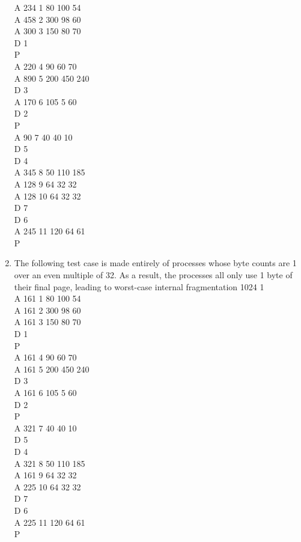 \documentclass{article}
\begin{document}
\begin{enumerate}
	A 234 1 80 100 54\\
	A 458 2 300 98 60\\
	A 300 3 150 80 70\\
	D 1\\
	P\\
	A 220 4 90 60 70\\
	A 890 5 200 450 240\\
	D 3\\
	A 170 6 105 5 60\\
	D 2\\
	P\\
	A 90 7 40 40 10\\
	D 5\\
	D 4\\
	A 345 8 50 110 185\\
	A 128 9 64 32 32\\
	A 128 10 64 32 32\\
	D 7\\
	D 6\\
	A 245 11 120 64 61\\
	P\\
	\item The following test case is made entirely of processes whose byte counts are 1 over an even multiple of 32. As a result, the processes all only use 1 byte of their final page, leading to worst-case internal fragmentation
	1024 1\\
	A 161 1 80 100 54\\
	A 161 2 300 98 60\\
	A 161 3 150 80 70\\
	D 1\\
	P\\
	A 161 4 90 60 70\\
	A 161 5 200 450 240\\
	D 3\\
	A 161 6 105 5 60\\
	D 2\\
	P\\
	A 321 7 40 40 10\\
	D 5\\
	D 4\\
	A 321 8 50 110 185\\
	A 161 9 64 32 32\\
	A 225 10 64 32 32\\
	D 7\\
	D 6\\
	A 225 11 120 64 61\\
	P\\
\end{enumerate}
\end{document}
